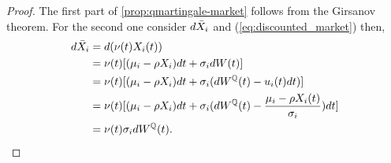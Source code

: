 \documentclass[../TGMAFFIRO.tex]{subfiles}
\begin{document}
\begin{proof}
	The first part of \ref{prop:qmartingale-market} follows from the Girsanov theorem. For the second one consider $d\bar{X}_i$ and (\ref{eq:discounted_market}) then,
	\begin{align*}
		d\bar{X}_i &= d(\nu(t)X_i(t)) \\
		&= \nu(t)[(\mu_i - \rho X_i)dt + \sigma_i dW(t)]\\
		&= \nu(t)[(\mu_i - \rho X_i)dt + \sigma_i (dW^{\mathbb{Q}}(t) - u_i(t)dt)]\\
		&= \nu(t)[(\mu_i - \rho X_i)dt + \sigma_i (dW^{\mathbb{Q}}(t) - \frac{\mu_i - \rho X_i(t)}{\sigma_i})dt]\\
		&= \nu(t)\sigma_idW^{\mathbb{Q}}(t). 
	\end{align*}
\end{proof}
\end{document}
